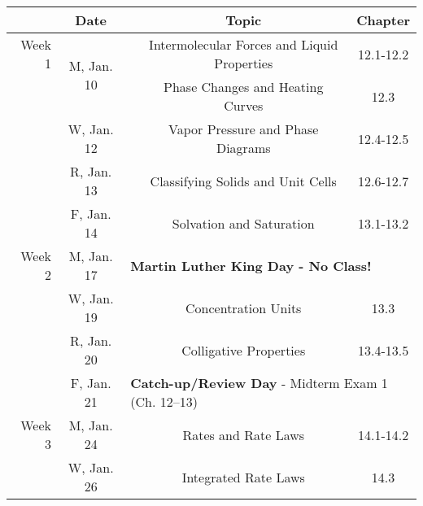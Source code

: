 \documentclass[12pt, letterpaper]{article}
\begin{document}
\begin{tabular}{rcccc}
	       & Date                        &                                                                                & Topic                                       & Chapter   \\
	\midrule
	Week 1 & \multirow{2}{*}{M, Jan. 10} &                                                                                & Intermolecular Forces and Liquid Properties & 12.1-12.2 \\
	       &                             &                                                                                & Phase Changes and Heating Curves            & 12.3      \\
	       & W, Jan. 12                  &                                                                                & Vapor Pressure and Phase Diagrams           & 12.4-12.5 \\
	       & R, Jan. 13                  &                                                                                & Classifying Solids and Unit Cells           & 12.6-12.7 \\
	       & F, Jan. 14                  &                                                                                & Solvation and Saturation                    & 13.1-13.2 \\
	\midrule
	Week 2 & M, Jan. 17                  & \multicolumn{3}{l}{\textbf{Martin Luther King Day - No Class!}}                                                                          \\
	       & W, Jan. 19                  &                                                                                & Concentration Units                         & 13.3      \\
	       & R, Jan. 20                  &                                                                                & Colligative Properties                      & 13.4-13.5 \\
	       & F, Jan. 21                  & \multicolumn{3}{l}{\textbf{Catch-up/Review Day} - Midterm Exam 1 (Ch. 12--13)}                                                           \\
	\midrule
	Week 3 & M, Jan. 24                  &                                                                                & Rates and Rate Laws                         & 14.1-14.2 \\
	       & W, Jan. 26                  &                                                                                & Integrated Rate Laws                        & 14.3      \\

\end{tabular}
\end{document}

